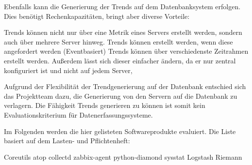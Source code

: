 Ebenfalls kann die Generierung der Trends auf dem Datenbanksystem erfolgen.
Dies benötigt Rechenkapazitäten, bringt aber diverse Vorteile:

\begin{outline}
  \1 Trends können nicht nur über eine Metrik eines Servers erstellt werden,
  sondern auch über mehrere Server hinweg.
  \1 Trends können erstellt werden, wenn diese angefordert werden
  (Eventbasiert)
  \1 Trends können über verschiedenste Zeitrahmen erstellt werden. Außerdem
  lässt sich dieser einfacher ändern, da er nur zentral konfiguriert ist und
  nicht auf jedem Server,
\end{outline}

Aufgrund der Flexibilität der Trendgenerierung auf der Datenbank entschied sich
das Projektteam dazu, die Generierung von den Servern auf die Datenbank zu
verlagern. Die Fähigkeit Trends generieren zu können ist somit kein
Evaluationskriterium für Datenerfassungssysteme.

Im Folgenden werden die hier gelisteten Softwareprodukte evaluiert. Die Liste
basiert auf dem Lasten- und Pflichtenheft:

\begin{outline}
  \1 Coreutils
  \1 atop
  \1 collectd
  \1 zabbix-agent
  \1 python-diamond
  \1 sysstat
  \1 Logstash
  \1 Riemann
\end{outline}
\tm%

